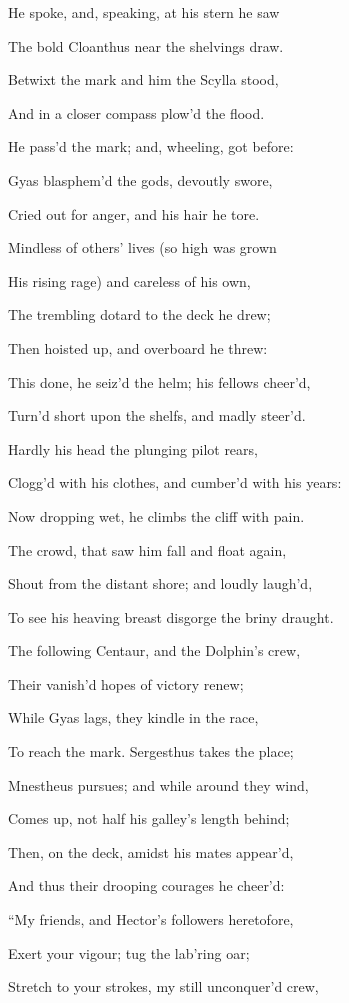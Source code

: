 He spoke, and, speaking, at his stern he saw

The bold Cloanthus near the shelvings draw.

Betwixt the mark and him the Scylla stood,

And in a closer compass plow’d the flood.

He pass’d the mark; and, wheeling, got before:

Gyas blasphem’d the gods, devoutly swore,

Cried out for anger, and his hair he tore.

Mindless of others’ lives (so high was grown

His rising rage) and careless of his own,

The trembling dotard to the deck he drew;

Then hoisted up, and overboard he threw:

This done, he seiz’d the helm; his fellows cheer’d,

Turn’d short upon the shelfs, and madly steer’d.

Hardly his head the plunging pilot rears,

Clogg’d with his clothes, and cumber’d with his years:

Now dropping wet, he climbs the cliff with pain.

The crowd, that saw him fall and float again,

Shout from the distant shore; and loudly laugh’d,

To see his heaving breast disgorge the briny draught.

The following Centaur, and the Dolphin’s crew,

Their vanish’d hopes of victory renew;

While Gyas lags, they kindle in the race,

To reach the mark. Sergesthus takes the place;

Mnestheus pursues; and while around they wind,

Comes up, not half his galley’s length behind;

Then, on the deck, amidst his mates appear’d,

And thus their drooping courages he cheer’d:

“My friends, and Hector’s followers heretofore,

Exert your vigour; tug the lab’ring oar;

Stretch to your strokes, my still unconquer’d crew,

